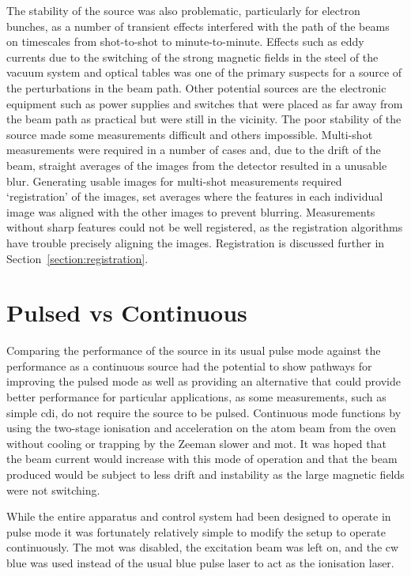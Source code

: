 The stability of the source was also problematic, particularly for electron bunches, as a number of transient effects interfered with the path of the beams on timescales from shot-to-shot to minute-to-minute.
Effects such as eddy currents due to the switching of the strong magnetic fields in the steel of the vacuum system and optical tables was one of the primary suspects for a source of the perturbations in the beam path.
Other potential sources are the electronic equipment such as power supplies and switches that were placed as far away from the beam path as practical but were still in the vicinity.
The poor stability of the source made some measurements difficult and others impossible.
Multi-shot measurements were required in a number of cases and, due to the drift of the beam, straight averages of the images from the detector resulted in a unusable blur.
Generating usable images for multi-shot measurements required `registration' of the images, set averages where the features in each individual image was aligned with the other images to prevent blurring.
Measurements without sharp features could not be well registered, as the registration algorithms have trouble precisely aligning the images.
Registration is discussed further in Section~\ref{section:registration}.

\section{Pulsed vs Continuous}\label{section:pulse_vs_continuous}
Comparing the performance of the source in its usual pulse mode against the performance as a continuous source had the potential to show pathways for improving the pulsed mode as well as providing an alternative that could provide better performance for particular applications, as some measurements, such as simple \gls{cdi}, do not require the source to be pulsed.
Continuous mode functions by using the two-stage ionisation and acceleration on the atom beam from the oven without cooling or trapping by the Zeeman slower and \gls{mot}.
It was hoped that the beam current would increase with this mode of operation and that the beam produced would be subject to less drift and instability as the large magnetic fields were not switching.

While the entire apparatus and control system had been designed to operate in pulse mode it was fortunately relatively simple to modify the setup to operate continuously.
The \gls{mot} was disabled, the excitation beam was left on, and the \gls{cw} blue was used instead of the usual blue pulse laser to act as the ionisation laser.

